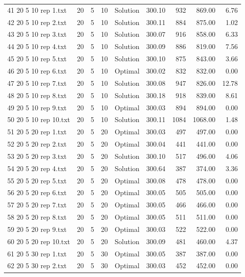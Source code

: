\begin{longtable}{lrrllrrrr}
41 20 5 10 rep 1.txt & 20 & 5 & 10 & Solution & 300.10 & 932 & 869.00 &  6.76\\
42 20 5 10 rep 2.txt & 20 & 5 & 10 & Solution & 300.11 & 884 & 875.00 &  1.02\\
43 20 5 10 rep 3.txt & 20 & 5 & 10 & Solution & 300.07 & 916 & 858.00 &  6.33\\
44 20 5 10 rep 4.txt & 20 & 5 & 10 & Solution & 300.09 & 886 & 819.00 &  7.56\\
45 20 5 10 rep 5.txt & 20 & 5 & 10 & Solution & 300.10 & 875 & 843.00 &  3.66\\
46 20 5 10 rep 6.txt & 20 & 5 & 10 & Optimal & 300.02 & 832 & 832.00 &  0.00\\
47 20 5 10 rep 7.txt & 20 & 5 & 10 & Solution & 300.08 & 947 & 826.00 & 12.78\\
48 20 5 10 rep 8.txt & 20 & 5 & 10 & Solution & 300.18 & 918 & 839.00 &  8.61\\
49 20 5 10 rep 9.txt & 20 & 5 & 10 & Optimal & 300.03 & 894 & 894.00 &  0.00\\
50 20 5 10 rep 10.txt & 20 & 5 & 10 & Solution & 300.11 & 1084 & 1068.00 &  1.48\\
51 20 5 20 rep 1.txt & 20 & 5 & 20 & Optimal & 300.03 & 497 & 497.00 &  0.00\\
52 20 5 20 rep 2.txt & 20 & 5 & 20 & Optimal & 300.04 & 441 & 441.00 &  0.00\\
53 20 5 20 rep 3.txt & 20 & 5 & 20 & Solution & 300.10 & 517 & 496.00 &  4.06\\
54 20 5 20 rep 4.txt & 20 & 5 & 20 & Solution & 300.64 & 387 & 374.00 &  3.36\\
55 20 5 20 rep 5.txt & 20 & 5 & 20 & Optimal & 300.08 & 478 & 478.00 &  0.00\\
56 20 5 20 rep 6.txt & 20 & 5 & 20 & Optimal & 300.05 & 505 & 505.00 &  0.00\\
57 20 5 20 rep 7.txt & 20 & 5 & 20 & Optimal & 300.05 & 466 & 466.00 &  0.00\\
58 20 5 20 rep 8.txt & 20 & 5 & 20 & Optimal & 300.05 & 511 & 511.00 &  0.00\\
59 20 5 20 rep 9.txt & 20 & 5 & 20 & Optimal & 300.03 & 522 & 522.00 &  0.00\\
60 20 5 20 rep 10.txt & 20 & 5 & 20 & Solution & 300.09 & 481 & 460.00 &  4.37\\
61 20 5 30 rep 1.txt & 20 & 5 & 30 & Optimal & 300.05 & 387 & 387.00 &  0.00\\
62 20 5 30 rep 2.txt & 20 & 5 & 30 & Optimal & 300.03 & 452 & 452.00 &  0.00\\

\end{longtable}
